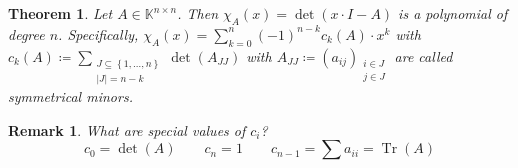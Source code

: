 \documentclass[a4paper]{article}
\newcounter{lecref}[section]
\numberwithin{lecref}{section}
\newtheorem{theorem}[lecref]{Theorem}
\newtheorem*{Remark}{Remark}
\newcommand{\set}[1]{\left\{#1\right\}}
\begin{document}
\begin{theorem} %
  Let $A \in \mathbb K^{n \times n}$. Then $\chi_A(x) = \det(x \cdot I - A)$ is a polynomial of degree $n$.
  Specifically, $\chi_A(x) = \sum_{k=0}^n (-1)^{n-k} c_k(A) \cdot x^k$ with $c_k(A) \coloneqq \sum_{\substack{J \subseteq \set{1, \dots, n} \\ |J| = n - k}} \det(A_{JJ})$
  with $A_{JJ} \coloneqq (a_{ij})_{\substack{i \in J \\ j \in J}}$ are called \emph{symmetrical minors}.
\end{theorem}

\begin{Remark}
  What are special values of $c_i$?
  \[
    c_0 = \det(A) \qquad
    c_n = 1 \qquad
    c_{n-1} = \sum a_{ii} = \operatorname{Tr}(A)
  \]
\end{Remark}
\end{document}
